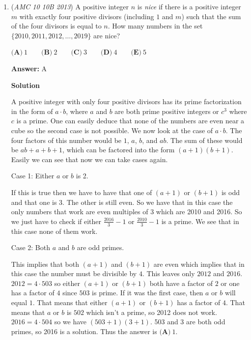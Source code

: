 \begin{enumerate}
 and $DY = BY - BD = BY - 5 = \frac{64}{25}$. 

 Clearly, $\triangle FYD$ is a $3 - 4 - 5$ pythagorean triple, so $DF = \frac{80}{25} = \frac{16}{5}$.

 $16 + 5 = m + n = \boxed{\textbf{(B) }21}$.

 


	\item (\textit{AMC 10 10B 2013}) A positive integer $n$ is \textit{nice} if there is a positive integer $m$ with exactly four positive divisors (including $1$ and $m$) such that the sum of the four divisors is equal to $n$. How many numbers in the set $\{ 2010,2011,2012,\dotsc,2019 \}$ are nice?


 

$\textbf{(A)}\ 1 \qquad\textbf{(B)}\ 2 \qquad\textbf{(C)}\ 3 \qquad\textbf{(D)}\ 4 \qquad\textbf{(E)}\ 5$

 \textbf{Answer: }A



\textbf{Solution}

A positive integer with only four positive divisors has its prime factorization in the form of $a \cdot b$, where $a$ and $b$ are both prime positive integers or $c^3$ where $c$ is a prime. One can easily deduce that none of the numbers are even near a cube so the second case is not possible. We now look at the case of $a \cdot b$. The four factors of this number would be $1$, $a$, $b$, and $ab$.  The sum of these would be $ab+a+b+1$, which can be factored into the form $(a+1)(b+1)$. Easily we can see that now we can take cases again. 

 Case 1: Either $a$ or $b$ is 2. 

 If this is true then we have to have that one of $(a+1)$ or $(b+1)$ is odd and that one is 3. The other is still even.  So we have that in this case the only numbers that work are even multiples of 3 which are 2010 and 2016. So we just have to check if either $\frac{2016}{3} - 1$  or $\frac{2010}{3} - 1$ is a prime. We see that in this case none of them work.

 Case 2: Both $a$ and $b$ are odd primes. 

 This implies that both $(a+1)$ and $(b+1)$ are even which implies that in this case the number must be divisible by $4$. This leaves only $2012$ and $2016$.$2012={4}\cdot{503}$ so either $(a+1)$ or $(b+1)$ both have a factor of $2$ or one has a factor of $4$ since $503$ is prime. If it was the first case, then $a$ or $b$ will equal $1$.  That means that either $(a+1)$ or $(b+1)$ has a factor of $4$.  That means that $a$ or $b$ is $502$ which isn't a prime, so 2012 does not work.  $2016 = 4 \cdot 504$ so we have $(503 + 1)(3 + 1)$. 503 and 3 are both odd primes, so 2016 is a solution. Thus the answer is $\boxed{\textbf{(A)}\ 1}$.


\end{enumerate}
